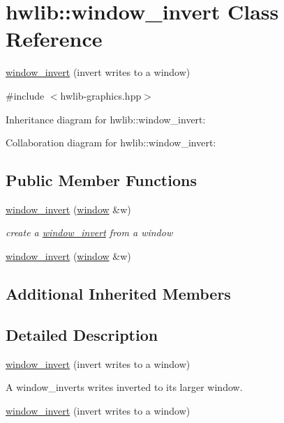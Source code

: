 \hypertarget{classhwlib_1_1window__invert}{}\section{hwlib\+:\+:window\+\_\+invert Class Reference}
\label{classhwlib_1_1window__invert}


\hyperlink{classhwlib_1_1window__invert}{window\+\_\+invert} (invert writes to a window)  




{\ttfamily \#include $<$hwlib-\/graphics.\+hpp$>$}



Inheritance diagram for hwlib\+:\+:window\+\_\+invert\+:


Collaboration diagram for hwlib\+:\+:window\+\_\+invert\+:
\subsection*{Public Member Functions}
\begin{DoxyCompactItemize}
\item 
\hyperlink{classhwlib_1_1window__invert_a2ee672d63f206e7e90558783f071d98a}{window\+\_\+invert} (\hyperlink{classhwlib_1_1window}{window} \&w)
\begin{DoxyCompactList}\small\item\em create a \hyperlink{classhwlib_1_1window__invert}{window\+\_\+invert} from a window \end{DoxyCompactList}\item 
\hyperlink{classhwlib_1_1window__invert_a2ee672d63f206e7e90558783f071d98a}{window\+\_\+invert} (\hyperlink{classhwlib_1_1window}{window} \&w)
\end{DoxyCompactItemize}
\subsection*{Additional Inherited Members}


\subsection{Detailed Description}
\hyperlink{classhwlib_1_1window__invert}{window\+\_\+invert} (invert writes to a window) 

A window\+\_\+inverts writes inverted to its larger window.

\hyperlink{classhwlib_1_1window__invert}{window\+\_\+invert} (invert writes to a window)

